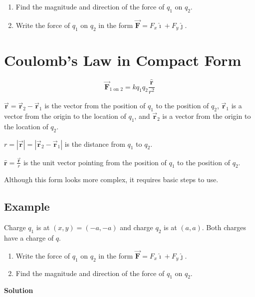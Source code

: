 \documentclass{article}
\renewcommand{\mbox}{\text}
\newcommand{\ihat}[0]{\hat{\boldsymbol{\imath}}}
\newcommand{\jhat}[0]{\hat{\boldsymbol{\jmath}}}
\newcommand{\rhat}[0]{\hat{\mathbf{r}}}
\newcommand{\bfvec}[1]{\vec{\mathbf{#1}}}
\begin{document}
\begin{enumerate}

  \item Find the magnitude and direction of the force of $q_1$ on $q_2$.

  \item Write the force of $q_1$ on $q_2$ in the form $\bfvec{F}=F_x\ihat + F_y\jhat$.

\end{enumerate}

\section{Coulomb's Law in Compact Form}

\begin{equation}
\bfvec{F}_{1\mbox{ on } 2}=kq_1q_2\frac{\rhat}{r^2}
\end{equation}

$\bfvec{r}=\bfvec{r}_2-\bfvec{r}_1$ is the vector from the position of $q_1$ to the position of $q_2$, $\bfvec{r}_1$ is a vector from the origin to the location of $q_1$, and $\bfvec{r}_2$ is a vector from the origin to the location of $q_2$.

$r=|\bfvec{r}|=|\bfvec{r}_2-\bfvec{r}_1|$ is the distance from $q_1$ to $q_2$.

$\displaystyle\rhat=\frac{\bfvec{r}}{r}$ is the unit vector pointing from the position of $q_1$ to the position of $q_2$.

Although this form looks more complex, it requires basic steps to use.

\subsection{Example}

Charge $q_1$ is at $(x,y)=(-a,-a)$ and charge $q_2$ is at $(a, a)$. Both charges have a charge of $q$.

\begin{enumerate}

  \item Write the force of $q_1$ on $q_2$ in the form $\bfvec{F}=F_x\ihat + F_y\jhat$.

  \item Find the magnitude and direction of the force of $q_1$ on $q_2$.

\end{enumerate}

\ifsolutions
\textbf{Solution}
\end{document}
